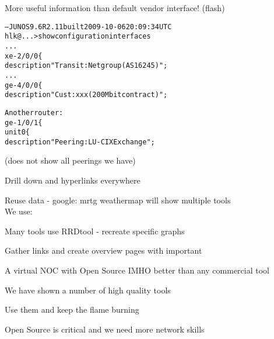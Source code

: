 \documentclass[28pt,landscape,a4paper,footrule]{foils}
\begin{document}


\centerline{More useful information than default vendor interface! (flash)}



\begin{alltt}	
--- JUNOS 9.6R2.11 built 2009-10-06 20:09:34 UTC
hlk@ ...> show configuration interfaces 
...
xe-2/0/0 \{
    description "Transit: Netgroup (AS16245)";
...
ge-4/0/0 \{
    description "Cust: xxx (200Mbit contract)";

Another router:
ge-1/0/1 \{
    unit 0 \{
        description "Peering: LU-CIX Exchange";

\end{alltt}






\centerline{(does not show all peerings we have)}



\centerline{Drill down and hyperlinks everywhere}





\begin{slidelist}
\item Reuse data - google: mrtg weathermap will show multiple tools\\
We use: 
\item Many tools use RRDtool - recreate specific graphs
\item Gather links and create overview pages with important 
\end{slidelist}

\centerline{A virtual NOC with Open Source IMHO better than any commercial tool}




\begin{slidelist}
\item We have shown a number of high quality tools
\item Use them and keep the flame burning
\item Open Source is critical and we need more network skills
\end{slidelist}
\end{document}
